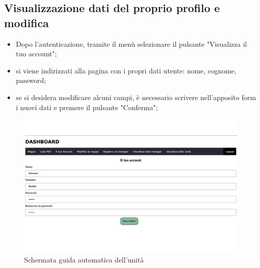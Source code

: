 \subsection{Visualizzazione dati del proprio profilo e modifica}
\begin{itemize}
    \item Dopo l'autenticazione, tramite il menù selezionare il pulsante "Visualizza il tuo account";
    \item si viene indirizzati alla pagina con i propri dati utente: nome, cognome, password;
    \item se si desidera modificare alcuni campi, è necessario scrivere nell'apposito form i nuovi dati e premere il pulsante "Conferma";
    
\end{itemize}
\begin{figure}[H]
    \centering
    \includegraphics[scale=0.12]{res/images/account_user.png}
    \caption{Schermata guida automatica dell'unità}
\end{figure}

